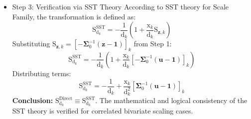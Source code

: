 \documentclass[12pt,a4paper, fleqn]{article}
\begin{document}
\begin{itemize}
    \item Step 3: Verification via SST Theory
    According to SST theory for Scale Family, the transformation is defined as:
    \begin{equation}
        \mathrm{S}_{\mathrm{d}_k}^{\text{SST}} = -\frac{1}{\mathrm{d}_k} \left( 1 + \frac{\mathrm{x}_k}{\mathrm{d}_k} \mathrm{S}_{\mathbf{z}, k} \right)
    \end{equation}
    Substituting $\mathrm{S}_{\mathbf{z}, k} = \left[ -\boldsymbol{\Sigma}_0^{-1}(\mathbf{z}-\mathbf{1}) \right]_k$ from Step 1:
    \begin{equation}
        \mathrm{S}_{\mathrm{d}_k}^{\text{SST}} = -\frac{1}{\mathrm{d}_k} \left( 1 + \frac{\mathrm{x}_k}{\mathrm{d}_k} \left[ -\boldsymbol{\Sigma}_0^{-1}(\mathbf{u}-\mathbf{1}) \right]_k \right)
    \end{equation}
    Distributing terms:
    \begin{equation}
        \mathrm{S}_{\mathrm{d}_k}^{\text{SST}} = -\frac{1}{\mathrm{d}_k} + \frac{\mathrm{x}_k}{\mathrm{d}_k^2} \left[ \boldsymbol{\Sigma}_0^{-1}(\mathbf{u}-\mathbf{1}) \right]_k
    \end{equation}
    \textbf{Conclusion:} $\mathrm{S}_{\mathrm{d}_k}^{\text{Direct}} \equiv \mathrm{S}_{\mathrm{d}_k}^{\text{SST}}$. The mathematical and logical consistency of the SST theory is verified for correlated bivariate scaling cases.
\end{itemize}
\end{document}
